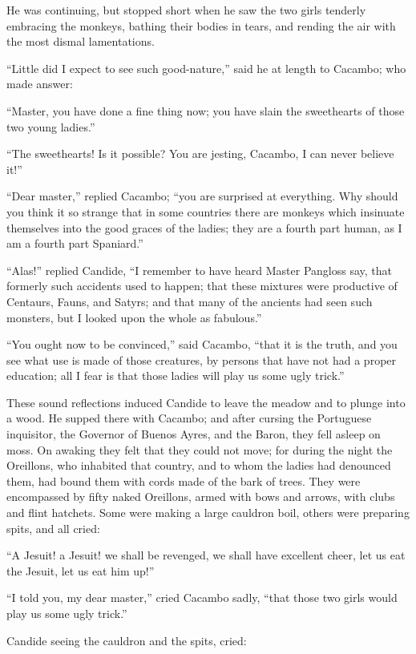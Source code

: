 He was continuing, but stopped short when he saw the two girls tenderly embracing the monkeys, bathing their bodies in tears, and rending the air with the most dismal lamentations.

``Little did I expect to see such good-nature,'' said he at length to Cacambo; who made answer:

``Master, you have done a fine thing now; you have slain the sweethearts of those two young ladies.''

``The sweethearts! Is it possible? You are jesting, Cacambo, I can never believe it!''

``Dear master,'' replied Cacambo; ``you are surprised at everything. Why should you think it so strange that in some countries there are monkeys which insinuate themselves into the good graces of the ladies; they are a fourth part human, as I am a fourth part Spaniard.''

``Alas!'' replied Candide, ``I remember to have heard Master Pangloss say, that formerly such accidents used to happen; that these mixtures were productive of Centaurs, Fauns, and Satyrs; and that many of the ancients had seen such monsters, but I looked upon the whole as fabulous.''

``You ought now to be convinced,'' said Cacambo, ``that it is the truth, and you see what use is made of those creatures, by persons that have not had a proper education; all I fear is that those ladies will play us some ugly trick.''

These sound reflections induced Candide to leave the meadow and to plunge into a wood. He supped there with Cacambo; and after cursing the Portuguese inquisitor, the Governor of Buenos Ayres, and the Baron, they fell asleep on moss. On awaking they felt that they could not move; for during the night the Oreillons, who inhabited that country, and to whom the ladies had denounced them, had bound them with cords made of the bark of trees. They were encompassed by fifty naked Oreillons, armed with bows and arrows, with clubs and flint hatchets. Some were making a large cauldron boil, others were preparing spits, and all cried:

``A Jesuit! a Jesuit! we shall be revenged, we shall have excellent cheer, let us eat the Jesuit, let us eat him up!''

``I told you, my dear master,'' cried Cacambo sadly, ``that those two girls would play us some ugly trick.''

Candide seeing the cauldron and the spits, cried:

